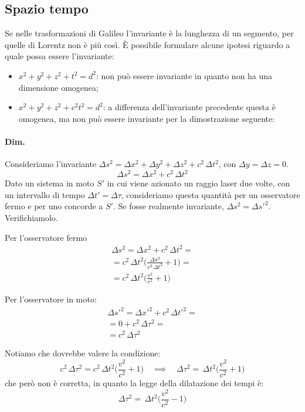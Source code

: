 \documentclass[a4paper, oneside]{article}
\newcounter{i}%
\newcounter{n}%
\begin{document}
\subsection{Spazio tempo}

Se nelle trasformazioni di Galileo l'invariante è la lunghezza di un segmento, per quelle di Lorentz non è più così. È possibile formulare alcune ipotesi riguardo a quale possa essere l'invariante:
\begin{itemize}
\item $x^2+y^2+z^2+t^2=d^2$: non può essere invariante in quanto non ha una dimensione omogenea;
\item $x^2+y^2+z^2+c^2t^2=d^2$: a differenza dell'invariante precedente questa è omogenea, ma non può essere invariante per la dimostrazione seguente:
\end{itemize}

\paragraph{Dim.} Consideriamo l'invariante $\Delta s^2=\Delta x^2+\Delta y^2+\Delta z^2+c^2\,\Delta t^2$, con $\Delta y = \Delta z = 0$.
\[
\Delta s^2 = \Delta x^2 + c^2\,\Delta t^2
\]
Dato un sistema in moto $S'$ in cui viene azionato un raggio laser due volte, con un intervallo di tempo $\Delta t'=\Delta \tau$, consideriamo questa quantità per un osservatore fermo e per uno concorde a $S'$.
Se fosse realmente invariante, $\Delta s^2 = \Delta s'^2$. Verifichiamolo.

Per l'osservatore fermo
\begin{multline*}
\Delta s^2 = \Delta x^2 + c^2\,\Delta t^2 = \\
= c^2\,\Delta t^2 \Big(\frac{\Delta x^2}{c^2\,\Delta t^2}+ 1\Big) = \\
= c^2\,\Delta t^2 \Big(\frac{v^2}{c^2}+1\Big)
\end{multline*}

Per l'osservatore in moto:
\begin{multline*}
\Delta s'^2 = \Delta x'^2 + c^2\,\Delta t'^2 = \\
= 0 + c^2\,\Delta \tau^2 = \\
= c^2\,\Delta \tau^2
\end{multline*}

Notiamo che dovrebbe valere la condizione:
\[
c^2\,\Delta \tau^2 = c^2\,\Delta t^2 \Big(\frac{v^2}{c^2}+1\Big)\quad\implies\quad\Delta\tau^2 = \,\Delta t^2 \Big(\frac{v^2}{c^2}+1\Big)
\]
che però non è corretta, in quanto la legge della dilatazione dei tempi è:
\[\Delta\tau^2 = \,\Delta t^2 \Big(\frac{v^2}{c^2}-1\Big)\]
\end{document}

